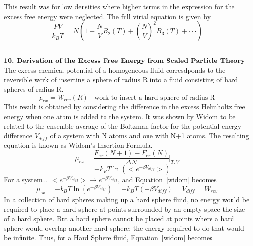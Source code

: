 \documentclass[double,12pt]{beavtex}
\begin{document}
\color{red}This result was for low densities where higher terms in the expression for the excess free energy were neglected. The full virial equation is given by\color{black}
\begin{equation}\frac{PV}{k_BT}=N\left(1+\frac{N}{V}B_2(T)+\left(\frac{N}{V}\right)^2B_3(T)+ \cdot\cdot\cdot\right) \end{equation}

\[{}\]

\noindent \textbf{10. Derivation of the Excess Free Energy from Scaled Particle Theory}
The excess chemical potential of a homogeneous fluid corresdponds to the reversible work of inserting a sphere of radius R 
into a fluid consisting of hard spheres of radius R. 
\begin{displaymath}\mu_{ex}=W_{rev}(R){~~~~}\text{work to insert a hard sphere of radius R}\end{displaymath}
This result is obtained by considering the difference in the excess Helmholtz free energy when one atom is added to the system. 
It was shown by Widom to be related to the ensemble average of the Boltzman factor for the potential energy difference $V_{diff}$ 
of a system with N atoms and one with N+1 atoms. The resulting equation is known as Widom's Insertion Formula.
\begin{equation}\mu_{ex}=\frac{F_{ex}(N+1)-F_{ex}(N)}{\Delta{N}}\bigg|_{T,V}\end{equation}
\begin{equation}\label{widom}{~}=-k_BT\ln\left(<e^{-\beta{V_{diff}}}>\right)\end{equation}
\color{red}For a system... $<e^{-\beta{V_{diff}}}> \rightarrow e^{-\beta{V_{diff}}}$, and Equation~\ref{widom} becomes 
\begin{equation}\mu_{ex}=-k_BT\ln\left(e^{-\beta{V_{diff}}}\right)=-k_BT(-\beta{V}_{diff})=V_{diff}=W_{rev}\end{equation}\color{black}
\indent In a collection of hard spheres making up a hard sphere fluid, no energy would be required to place a hard sphere at points 
surrounded by an empty space the size of a hard sphere. But a hard sphere cannot be placed at points where a hard sphere would 
overlap another hard sphere; the energy required to do that would be infinite. Thus, for a Hard Sphere fluid, Equation~\ref{widom} becomes
\end{document}
